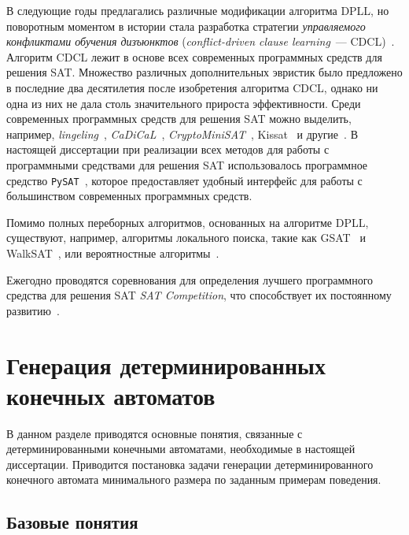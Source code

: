 В следующие годы предлагались различные модификации алгоритма DPLL, но поворотным моментом в истории стала разработка стратегии \emph{управляемого конфликтами обучения дизъюнктов} (\emph{conflict-driven clause learning}~--- CDCL)~\cite{DBLP:conf/iccad/SilvaS96,DBLP:journals/tc/Marques-SilvaS99}.
Алгоритм CDCL лежит в основе всех современных программных средств для решения SAT.
Множество различных дополнительных эвристик было предложено в последние два десятилетия после изобретения алгоритма CDCL, однако ни одна из них не дала столь значительного прироста эффективности.
Среди современных программных средств для решения SAT можно выделить, например, \emph{lingeling}~\cite{DBLP:conf/sat/Biere14}, \emph{CaDiCaL}~\cite{biere2017cadical}, \emph{CryptoMiniSAT}~\cite{DBLP:conf/sat/SoosNC09}, Kissat~\cite{fleury2020cadical} и другие~\cite{sat-competition-2020}.
В настоящей диссертации при реализации всех методов для работы с программными средствами для решения SAT использовалось программное средство \texttt{PySAT}~\cite{imms-sat18}, которое предоставляет удобный интерфейс для работы с большинством современных программных средств. 

Помимо полных переборных алгоритмов, основанных на алгоритме DPLL, существуют, например, алгоритмы локального поиска, такие как GSAT~\cite{DBLP:conf/aaai/SelmanLM92} и WalkSAT~\cite{DBLP:conf/dimacs/SelmanKC93}, или вероятностные алгоритмы~\cite{DBLP:conf/focs/Schoning99}.

Ежегодно проводятся соревнования для определения лучшего программного средства для решения SAT \emph{SAT Competition}, что способствует их постоянному развитию~\cite{sat-competitions}.


\section{Генерация детерминированных конечных автоматов} 
\label{sec:review:dfa-inf}

В данном разделе приводятся основные понятия, связанные с детерминированными конечными автоматами, необходимые в настоящей диссертации.
Приводится постановка задачи генерации детерминированного конечного автомата минимального размера по заданным примерам поведения.

\subsection{Базовые понятия} 
\label{sec:review:dfa-inf:dfa-def}

